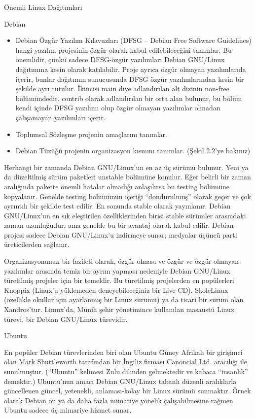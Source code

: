 \begin{section}{Önemli Linux Dağıtımları}
\begin{subsection}{Debian}
\begin{itemize}
 \item Debian Özgür Yazılım Kılavuzları (DFSG – Debian Free Software Guidelines) hangi yazılım projesinin özgür olarak kabul edilebileceğini tanımlar. Bu önemlidir, çünkü sadece DFSG-özgür yazılımları Debian GNU/Linux dağıtımına kesin olarak katılabilir. Proje ayrıca özgür olmayan yazılımlarıda içerir, bunlar dağıtımın sunucusunda DFSG özgür yazılımlarından kesin bir şekilde ayrı tutulur. İkincisi main diye adlandırılan alt dizinin non-free bölümündedir. contrib olarak adlandırılan bir orta alan bulunur, bu bölüm kendi içinde DFSG yazılımı olup özgür olmayan yazılımlar olmadan çalışamayan yazılımları içerir.
 \item Toplumsal Sözleşme projenin amaçlarını tanımlar.
 \item Debian Tüzüğü projenin organizasyon kısmını tanımlar. (Şekil 2.2'ye bakınız)
\end{itemize}

Herhangi bir zamanda Debian GNU/Linux'un en az üç sürümü bulunur. Yeni ya da düzeltilmiş sürüm paketleri unstable bölümüne konulur. Eğer belirli bir zaman aralığında pakette önemli hatalar olmadığı anlaşılırsa bu testing bölümüne kopyalanır. Genelde testing bölümünün içeriği “dondurulmuş” olarak geçer ve çok ayrıntılı bir şekilde test edilir. En sonunda stable olarak yayınlanır. Debian GNU/Linux'un en sık eleştirilen özelliklerinden birisi stable sürümler arasındaki zaman uzunluğudur, ama genelde bu bir avantaj olarak kabul edilir. Debian projesi sadece Debian GNU/Linux'u indirmeye sunar; medyalar üçüncü parti üreticilerden sağlanır.

Organizasyonunun bir fazileti olarak, özgür olması ve özgür ve özgür olmayan yazılımlar arasında temiz bir ayrım yapması nedeniyle Debian GNU/Linux türetilmiş projeler için bir temeldir. Bu türetilmiş projelerden en popülerleri Knoppix (Linux'u yüklemeden deneyebileceğiniz bir Live CD), SkoleLinux (özellikle okullar için ayarlanmış bir Linux sürümü) ya da ticari bir sürüm olan Xandros'tur. Limux'da, Münih şehir yönetimince kullanılan masaüstü Linux türevi, bir Debian GNU/Linux türevidir.

\end{subsection}
\begin{subsection}{Ubuntu}

En popüler Debian türevlerinden biri olan Ubuntu Güney Afrikalı bir girişimci olan Mark Shuttleworth tarafından bir İngiliz firması Canoncial Ltd. aracılığı ile sunulmuştur. (“Ubuntu” kelimesi Zulu dilinden gelmektedir ve kabaca “insanlık” demektir.) Ubuntu'nun amacı Debian GNU/Linux tabanlı düzenli aralıklarla güncellenen güncel, yetenekli, anlaması-kolay bir Linux sürümü sunmaktır. Örnek olarak Debian on ya da daha fazla mimariye yönelik çalışabilmesine rağmen Ubuntu sadece üç mimariye hizmet sunar.


\end{subsection}
\end{section}
